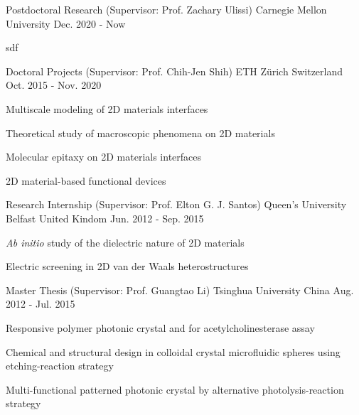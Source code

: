 

\begin{cventries}
\cventry
{Postdoctoral Research (Supervisor: Prof.  Zachary Ulissi)} %
{Carnegie Mellon University} %
{} %
{Dec. 2020 - Now} %
{
  \begin{cvitems}
  \item sdf
  \end{cvitems}
}
\cventry
{Doctoral Projects (Supervisor: Prof.  Chih-Jen Shih)} %
{ETH Z\"{u}rich} %
{Switzerland} %
{Oct. 2015 - Nov. 2020} %
{
  \begin{cvitems}
  \item Multiscale modeling of 2D materials interfaces
  \item Theoretical study of macroscopic phenomena on 2D materials
  \item Molecular epitaxy on 2D materials interfaces
  \item 2D material-based functional devices
  \end{cvitems}
}

\cventry
{Research Internship (Supervisor: Prof.  Elton G. J. Santos)} %
{Queen's University Belfast} %
{United Kindom} %
{Jun. 2012 - Sep. 2015} %
{
  \begin{cvitems}
  \item \textit{Ab initio} study of the dielectric nature of 2D materials
  \item Electric screening in 2D van der Waals heterostructures
  \end{cvitems}
}

\cventry
{Master Thesis (Supervisor: Prof.  Guangtao Li)}
{Tsinghua University}
{China}
{Aug. 2012 - Jul. 2015}
{
  \begin{cvitems}
  \item Responsive polymer photonic crystal and for acetylcholinesterase assay
  \item Chemical and structural design in colloidal crystal microfluidic spheres using etching-reaction strategy
  \item Multi-functional patterned photonic crystal by alternative photolysis-reaction strategy
  \end{cvitems}
}


\end{cventries}
